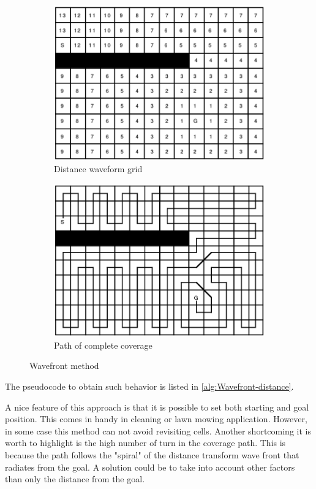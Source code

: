 \begin{figure}[ht]
\centering
\begin{subfigure}{.5\textwidth}
  \centering
  \includegraphics[width=.9\linewidth]{figures/C3/wavefrontGrid.png}
  \caption{Distance waveform grid}
\end{subfigure}%
\begin{subfigure}{.5\textwidth}
  \centering
  \includegraphics[width=.9\linewidth]{figures/C3/wavefrontCPath.png}
  \caption{Path of complete coverage}
\end{subfigure}
\caption{Wavefront method \cite{Zelinsky93planningpaths}}
\label{fig:wavefront}
\end{figure}
The pseudocode to obtain such behavior is listed in \autoref{alg:Wavefront-distance}.\par
A nice feature of this approach is that it is possible to set both starting and goal position. This comes in handy in cleaning or lawn mowing application. However, in some case this method can not avoid revisiting cells. Another shortcoming it is worth to highlight is the high number of turn in the coverage path. This is because the path follows the "spiral" of the distance transform wave front that radiates from the goal. A solution could be to take into account other factors than only the distance from the goal.\par
